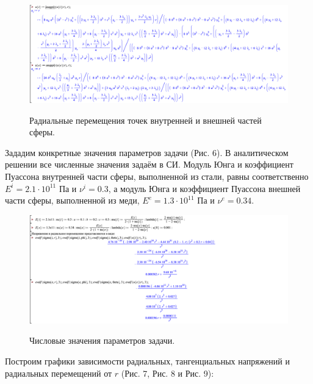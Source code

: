 \documentclass[a4paper,12pt]{article}	%
\begin{document}
\begin{figure}[H]
  \centering
  \includegraphics[scale=0.47]{img/Displacement_Lab1.png}\\
  \caption{Радиальные перемещения точек внутренней и внешней частей сферы.}
  \label{fig_5}
\end{figure}
\newpage
Зададим конкретные значения параметров задачи (Рис. 6). В аналитическом решении все численные значения задаём в СИ. Модуль Юнга и коэффициент Пуассона внутренней части сферы, выполненной из стали, равны соответственно $E^{i}=2.1\cdot 10^{11}$ Па и $\nu^{i}=0.3$, а модуль Юнга и коэффициент Пуассона внешней части сферы, выполненной из меди, $E^{e}=1.3\cdot 10^{11}$ Па и $\nu^{e}=0.34$.

\begin{figure}[H]
  \centering
  \includegraphics[scale=0.55]{img/Parameters_Lab1.png}\\
  \caption{Числовые значения параметров задачи.}
  \label{fig_6}
\end{figure}
Построим графики зависимости радиальных, тангенциальных напряжений и радиальных перемещений от $r$ (Рис. 7, Рис. 8 и Рис. 9):
\end{document}
